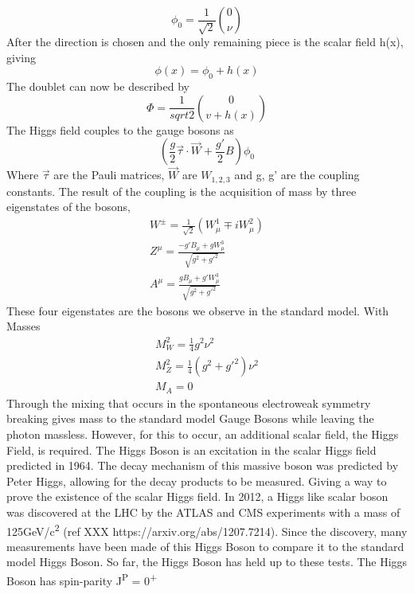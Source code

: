  
\begin{equation}
\phi_{0} = \frac{1}{\sqrt{2}} \binom{0}{\nu}
\end{equation}
After the direction is chosen and the only remaining piece is the scalar field h(x), giving 
\begin{equation}
\phi(x) = \phi_{0} + h(x)
\end{equation}
The doublet can now be described by 
\begin{equation}
\Phi = \frac{1}{sqrt{2}} \binom{0}{v+h(x)}
\end{equation}
The Higgs field couples to the gauge bosons as 
\begin{equation}
(\frac{g}{2}\overrightarrow{\tau}\cdot \overrightarrow{W} + \frac{g'}{2}B)\phi_{0}
\end{equation}
Where ${\overrightarrow{\tau}}$ are the Pauli matrices, ${\overrightarrow{W}}$ are ${W_{1,2,3}}$ and g, g' are the coupling constants. The result of the coupling is the acquisition of mass by three eigenstates of the bosons, 
\begin{equation}
\begin{split}
W^{\pm} = \frac{1}{\sqrt{2}}(W^{1}_{\mu} \mp iW^{2}_{\mu})\\
Z^{\mu} = \frac{-g'B_{\mu} + gW^{3}_{\mu}}{\sqrt{g^{2} + g'^{2}}}\\
A^{\mu} = \frac{gB_{\mu} + g'W^{3}_{\mu}}{\sqrt{g^{2} + g'^{2}}}
\end{split}
\end{equation}
These four eigenstates are the bosons we observe in the standard model. With Masses
\begin{equation}
\begin{split}
M^{2}_{W} = \frac{1}{4}g^{2}\nu^{2} \\
M^{2}_{Z} = \frac{1}{4}(g^{2} + g'^{2})\nu^{2} \\
M_{A} = 0
\end{split}
\end{equation}
Through the mixing that occurs in the spontaneous electroweak symmetry breaking gives mass to the standard model Gauge Bosons while leaving the photon massless. However, for this to occur, an additional scalar field, the Higgs Field, is required.\linebreak
\indent The Higgs Boson is an excitation in the scalar Higgs field predicted in 1964. The decay mechanism of this massive boson was predicted by Peter Higgs, allowing for the decay products to be measured. Giving a way to prove the existence of the scalar Higgs field. In 2012, a Higgs like scalar boson was discovered at the LHC by the ATLAS and CMS experiments with a mass of 125GeV/c\textsuperscript{2} (ref XXX https://arxiv.org/abs/1207.7214). Since the discovery, many measurements have been made of this Higgs Boson to compare it to the standard model Higgs Boson. So far, the Higgs Boson has held up to these tests. The Higgs Boson has spin-parity J\textsuperscript{P} = 0\textsuperscript{+} 
